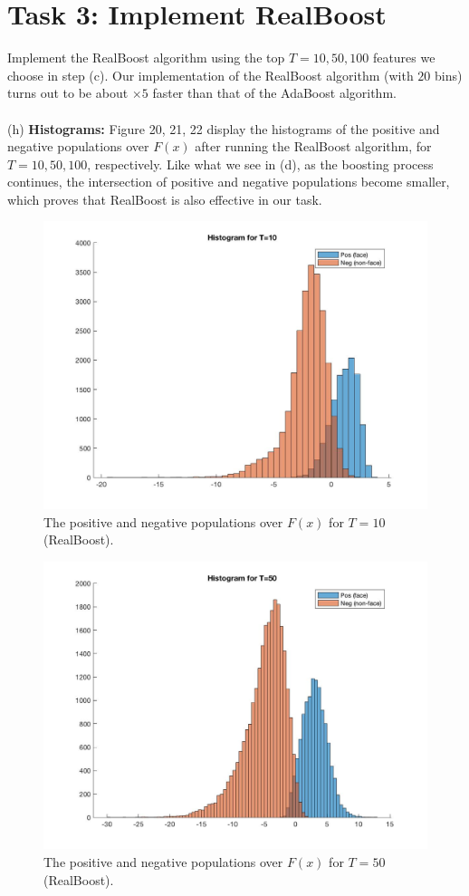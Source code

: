 \documentclass[10pt]{article}
\begin{document}
\section*{\large{Task 3: Implement RealBoost}}
Implement the RealBoost algorithm using the top $T=10,50,100$ features we choose in step (c). Our implementation of the RealBoost algorithm (with $20$ bins) turns out to be about $\times5$ faster than that of the AdaBoost algorithm. \\\\
	(h) \textbf{Histograms:} Figure 20, 21, 22 display the histograms of the positive and negative populations over $F(x)$ after running the RealBoost algorithm, for $T=10,50,100$, respectively. Like what we see in (d), as the boosting process continues, the intersection of positive and negative populations become smaller, which proves that RealBoost is also effective in our task.\\
	\begin{figure}[ht]
		\includegraphics[scale = 0.2]{pos_neg_hist_10_real.jpg}
		\centering
		\caption{The positive and negative populations over $F(x)$ for $T=10$ (RealBoost).}
		\label{20}
	\end{figure}
	\begin{figure}[ht]
		\includegraphics[scale = 0.2]{pos_neg_hist_50_real.jpg}
		\centering
		\caption{The positive and negative populations over $F(x)$ for $T=50$ (RealBoost).}
		\label{21}
	\end{figure}
\end{document}
